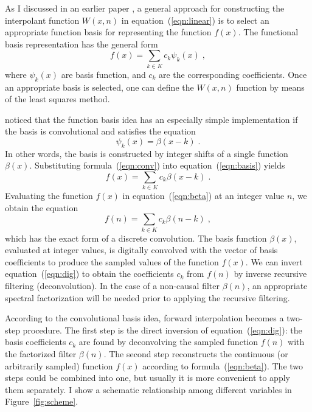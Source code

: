 As I discussed in an earlier paper \cite{Fomel.sep.94.sergey2}, a
general approach for constructing the interpolant function $W(x,n)$ in
equation~(\ref{eqn:linear}) is to select an appropriate function basis
for representing the function $f(x)$. The functional basis
representation has the general form
\begin{equation}\label{eqn:basis}
  f (x) = \sum_{k \in K} c_k \psi_k (x)\;,
\end{equation}
where $\psi_k(x)$ are basis function, and $c_k$ are the corresponding
coefficients. Once an appropriate basis is selected, one can define
the $W(x,n)$ function by means of the least squares method.
\par
{} noticed that the function basis idea has an
especially simple implementation if the basis is
convolutional and satisfies the equation
\begin{equation}
  \label{eqn:conv}
  \psi_k (x) = \beta (x-k)\;.
\end{equation}
In other words, the basis is constructed by integer shifts
of a single function $\beta(x)$. Substituting
formula~(\ref{eqn:conv}) into equation~(\ref{eqn:basis}) yields
\begin{equation}\label{eqn:beta}
  f (x) = \sum_{k \in K} c_k \beta (x - k)\;.
\end{equation}
Evaluating the function $f(x)$ in equation~(\ref{eqn:beta}) at an
integer value $n$, we obtain the equation
\begin{equation}\label{eqn:dig}
  f (n) = \sum_{k \in K} c_k \beta (n-k)\;,
\end{equation}
which has the exact form of a discrete convolution. The basis function
$\beta(x)$, evaluated at integer values, is digitally convolved with
the vector of basis coefficients to produce the sampled values of the
function $f(x)$. We can invert equation~(\ref{eqn:dig}) to obtain the
coefficients $c_k$ from $f(n)$ by inverse recursive filtering
(deconvolution). In the case of a non-causal filter $\beta(n)$, an 
appropriate spectral factorization will be
needed prior to applying the recursive filtering.
\par
According to the convolutional basis idea, forward interpolation
becomes a two-step procedure. The first step is the direct inversion
of equation~(\ref{eqn:dig}): the basis coefficients $c_k$ are found by
deconvolving the sampled function $f(n)$ with the factorized filter
$\beta(n)$. The second step reconstructs the continuous (or arbitrarily
sampled) function $f(x)$ according to formula~(\ref{eqn:beta}). The
two steps could be combined into one, but usually it is more
convenient to apply them separately. I show a schematic relationship
among different variables in Figure~\ref{fig:scheme}.

